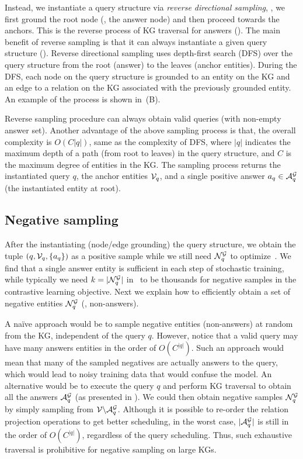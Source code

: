 Instead, we instantiate a query structure via {\em reverse directional sampling}, \ie, we first ground the root node (\ie, the answer node) and then proceed towards the anchors. This is the reverse process of KG traversal for answers (). The main benefit of reverse sampling is that it can always instantiate a given query structure (). Reverse directional sampling uses depth-first search (DFS) over the query structure from the root (answer) to the leaves (anchor entities). During the DFS, each node on the query structure is grounded to an entity on the KG and an edge to a relation on the KG associated with the previously grounded entity. An example of the process is shown in~(B). 

Reverse sampling procedure can always obtain valid queries (with non-empty answer set). Another advantage of the above sampling process is that, the overall complexity is $O(C|q|)$, same as the complexity of DFS, where $|q|$ indicates the maximum depth of a path (from root to leaves) in the query structure, and $C$ is the maximum degree of entities in the KG. The sampling process returns the instantiated query $q$, the anchor entities $\mathcal{V}_q$, and a single positive answer $a_q \in \mathcal{A}_q^{\mathcal{G}}$ (the instantiated entity at root). 


\subsection{Negative sampling}
\label{sec:bidir_sampling}

After the instantiating (node/edge grounding) the query structure, we obtain the tuple $(q, \mathcal{V}_q, \left\{a_q\right\})$ as a positive sample while we still need $\mathcal{N}_q^{\mathcal{G}}$ to optimize~. We find that a single answer entity is sufficient in each step of stochastic training, while typically we need $k = |\mathcal{N}_q^{\mathcal{G}}|$ in~ to be thousands for negative samples in the contrastive learning objective. Next we explain how to efficiently obtain a set of negative entities $\mathcal{N}_q^{\mathcal{G}}$ (\ie, non-answers).

A na\"ive approach would be to sample negative entities (non-answers) at random from the KG, independent of the query $q$. However, notice that a valid query may have many answers entities in the order of $O(C^{|q|})$. Such an approach would mean that many of the sampled negatives are actually answers to the query, which would lead to noisy training data that would confuse the model.
An alternative would be to execute the query $q$ and perform KG traversal to obtain all the answers $\mathcal{A}_q^{\mathcal{G}}$ (as presented in ). We could then obtain negative samples $\mathcal{N}_q^{\mathcal{G}}$ by simply sampling from $\mathcal{V} \backslash\mathcal{A}_q^{\mathcal{G}}$. Although it is possible to re-order the relation projection operations to get better scheduling, in the worst case, $|\mathcal{A}_q^{\mathcal{G}}|$ is still in the order of $O(C^{|q|})$, regardless of the query scheduling. Thus, such exhaustive traversal is prohibitive for negative sampling on large KGs.


